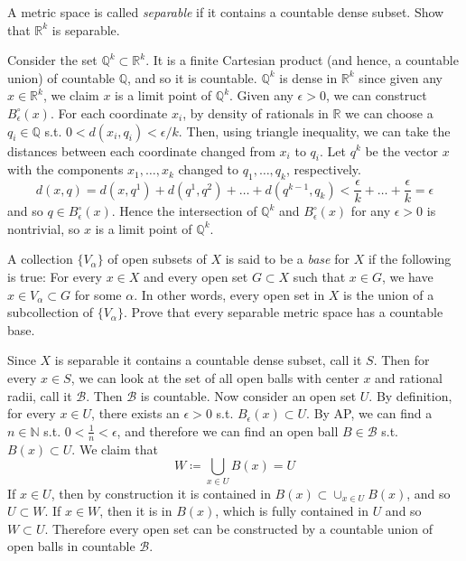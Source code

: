   \begin{exercise}[Rudin 2.22]
    A metric space is called \textit{separable} if it contains a countable dense subset. Show that $\mathbb{R}^k$ is separable. 
  \end{exercise}
  \begin{solution}
    Consider the set $\mathbb{Q}^k \subset \mathbb{R}^k$. It is a finite Cartesian product (and hence, a countable union) of countable $\mathbb{Q}$, and so it is countable. $\mathbb{Q}^k$ is dense in $\mathbb{R}^k$ since given any $x \in \mathbb{R}^k$, we claim $x$ is a limit point of $\mathbb{Q}^k$. Given any $\epsilon > 0$, we can construct $B_\epsilon^\circ (x)$. For each coordinate $x_i$, by density of rationals in $\mathbb{R}$ we can choose a $q_i \in \mathbb{Q}$ s.t. $0 < d(x_i, q_i) < \epsilon / k$. Then, using triangle inequality, we can take the distances between each coordinate changed from $x_i$ to $q_i$. Let $q^k$ be the vector $x$ with the components $x_1, \ldots, x_k$ changed to $q_1, \ldots, q_k$, respectively. 
    \begin{equation}
      d(x, q) = d(x, q^1) + d(q^1, q^2) + \ldots + d(q^{k-1}, q_k) < \frac{\epsilon}{k} + \ldots + \frac{\epsilon}{k} = \epsilon
    \end{equation}
    and so $q \in B_\epsilon^\circ (x)$. Hence the intersection of $\mathbb{Q}^k$ and $B_\epsilon^\circ (x)$ for any $\epsilon > 0$ is nontrivial, so $x$ is a limit point of $\mathbb{Q}^k$. 
  \end{solution}

  \begin{exercise}[Rudin 2.23]
    A collection $\{V_\alpha\}$ of open subsets of $X$ is said to be a \textit{base} for $X$ if the following is true: For every $x \in X$ and every open set $G \subset X$ such that $x \in G$, we have $x \in V_\alpha \subset G$ for some $\alpha$. In other words, every open set in $X$ is the union of a subcollection of $\{V_\alpha\}$. Prove that every separable metric space has a countable base. 
  \end{exercise}
  \begin{solution}
    Since $X$ is separable it contains a countable dense subset, call it $S$. Then for every $x \in S$, we can look at the set of all open balls with center $x$ and rational radii, call it $\mathcal{B}$. Then $\mathcal{B}$ is countable. Now consider an open set $U$. By definition, for every $x \in U$, there exists an $\epsilon > 0$ s.t. $B_\epsilon (x) \subset U$. By AP, we can find a $n \in \mathbb{N}$ s.t. $0 < \frac{1}{n} < \epsilon$, and therefore we can find an open ball $B \in \mathcal{B}$ s.t. $B (x) \subset U$. We claim that 
    \begin{equation}
      W \coloneqq \bigcup_{x \in U} B (x) = U
    \end{equation}
    If $x \in U$, then by construction it is contained in $B(x) \subset \cup_{x \in U } B(x)$, and so $U \subset W$. If $x \in W$, then it is in $B(x)$, which is fully contained in $U$ and so $W \subset U$. Therefore every open set can be constructed by a countable union of open balls in countable $\mathcal{B}$. 
  \end{solution} 

